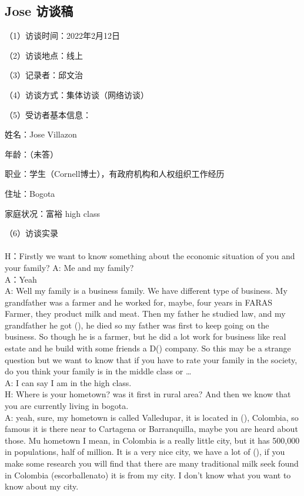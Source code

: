\documentclass{phyasgn}\usepackage{nag}
\begin{document}
\subsection{Jose 访谈稿}
\par （1）访谈时间：2022年2月12日 
\par （2）访谈地点：线上
\par （3）记录者：邱文治
\par （4）访谈方式：集体访谈（网络访谈）
\par （5）受访者基本信息：
  \par 姓名：Jose Villazon
\par 年龄：（未答）	
\par 职业：学生（Cornell博士），有政府机构和人权组织工作经历
\par 住址：Bogota
\par 家庭状况：富裕 high class
\par （6）访谈实录\\
\\
H：Firstly we want to know something about the economic situation of you and your family?
A: Me and my family?\\
A：Yeah\\
A: Well my family is a business family. We have different type of business. My grandfather was a farmer and he worked for, maybe, four years in FARAS Farmer, they product milk and meat. Then my father he studied law, and my grandfather he got (), he died so my father was first to keep going on the business. So though he is a farmer, but he did a lot work for business like real estate and he build with some friends a D() company.
So this may be a strange question but we want to know that if you have to rate your family in the society, do you think your family is in the middle class or …\\
A: I can say I am in the high class.\\
H: Where is your hometown? was it first in rural area? And then we know that you are currently living in bogota.\\
A: yeah, sure, my hometown is called Valledupar, it is located in (), Colombia, so famous it is there near to Cartagena or Barranquilla, maybe you are heard about those. Mu hometown I mean, in Colombia is a really little city, but it has 500,000 in populations, half of million. It is a very nice city, we have a lot of (), if you make some research you will find that there are many traditional milk seek found in Colombia (escorballenato) it is from my city. I don’t know what you want to know about my city.\\
\end{document}
